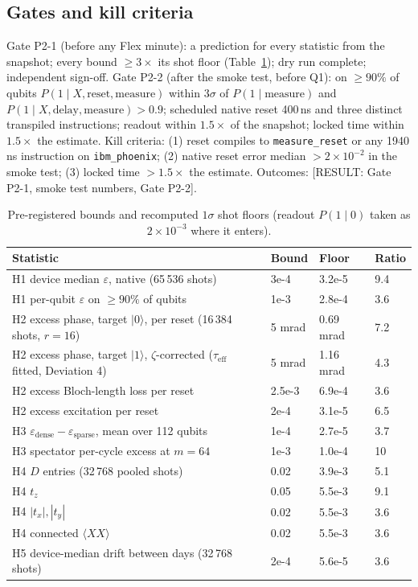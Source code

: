 \documentclass[aps,pra,reprint,superscriptaddress,nofootinbib,longbibliography,amsmath,amssymb]{revtex4-2}
\newcommand{\placeholder}[1]{\textcolor{red!70!black}{[RESULT: #1]}}
\newcommand{\eps}{\varepsilon}
\begin{document}
\subsection{Gates and kill criteria}
Gate P2-1 (before any Flex minute): a prediction for every statistic from the snapshot; every bound $\geq 3\times$ its shot floor (Table~\ref{tab:floors}); dry run complete; independent sign-off. Gate P2-2 (after the smoke test, before Q1): on $\geq 90\%$ of qubits $P(1\mid X,\text{reset},\text{measure})$ within $3\sigma$ of $P(1\mid\text{measure})$ and $P(1\mid X,\text{delay},\text{measure}) > 0.9$; scheduled native reset 400\,ns and three distinct transpiled instructions; readout within $1.5\times$ of the snapshot; locked time within $1.5\times$ the estimate. Kill criteria: (1) reset compiles to \texttt{measure\_reset} or any 1940\,ns instruction on \texttt{ibm\_phoenix}; (2) native reset error median $> 2\times10^{-2}$ in the smoke test; (3) locked time $> 1.5\times$ the estimate. Outcomes: \placeholder{Gate P2-1, smoke test numbers, Gate P2-2}.

\begin{table}[t]
\caption{Pre-registered bounds and recomputed $1\sigma$ shot floors (readout $P(1\mid0)$ taken as $2\times10^{-3}$ where it enters). \label{tab:floors}}
\begin{ruledtabular}
\begin{tabular}{llll}
Statistic & Bound & Floor & Ratio \\
\hline
H1 device median $\eps$, native (65\,536 shots) & 3e-4 & 3.2e-5 & 9.4 \\
H1 per-qubit $\eps$ on $\geq 90\%$ of qubits & 1e-3 & 2.8e-4 & 3.6 \\
H2 excess phase, target $|0\rangle$, per reset (16\,384 shots, $r = 16$) & 5 mrad & 0.69 mrad & 7.2 \\
H2 excess phase, target $|1\rangle$, $\zeta$-corrected ($\tau_{\mathrm{eff}}$ fitted, Deviation 4) & 5 mrad & 1.16 mrad & 4.3 \\
H2 excess Bloch-length loss per reset & 2.5e-3 & 6.9e-4 & 3.6 \\
H2 excess excitation per reset & 2e-4 & 3.1e-5 & 6.5 \\
H3 $\eps_{\mathrm{dense}} - \eps_{\mathrm{sparse}}$, mean over 112 qubits & 1e-4 & 2.7e-5 & 3.7 \\
H3 spectator per-cycle excess at $m = 64$ & 1e-3 & 1.0e-4 & 10 \\
H4 $D$ entries (32\,768 pooled shots) & 0.02 & 3.9e-3 & 5.1 \\
H4 $t_z$ & 0.05 & 5.5e-3 & 9.1 \\
H4 $|t_x|, |t_y|$ & 0.02 & 5.5e-3 & 3.6 \\
H4 connected $\langle XX\rangle$ & 0.02 & 5.5e-3 & 3.6 \\
H5 device-median drift between days (32\,768 shots) & 2e-4 & 5.6e-5 & 3.6 \\
\end{tabular}
\end{ruledtabular}
\end{table}
\end{document}
